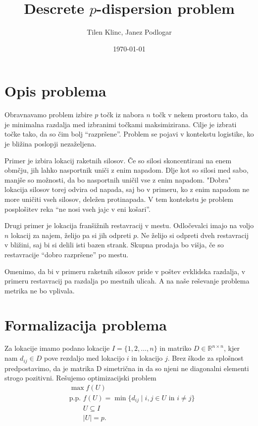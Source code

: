 \documentclass{article}
\title{Descrete $p$-dispersion problem}
\author{Tilen Klinc, Janez Podlogar}
\date{\today}
\begin{document}
    
\maketitle

\section{Opis problema}

Obravnavamo problem izbire $ p $ točk iz nabora $ n $ točk v nekem prostoru
tako, da je minimalna razdalja med izbranimi točkami maksimizirana. Cilje je
izbrati točke tako, da so čim bolj ``razpršene''. Problem se pojavi v kontekstu
logistike, ko je bližina poslopji nezaželjena.


Primer je izbira lokacij raketnih silosov. Če so silosi skoncentirani na enem
obmčju, jih lahko nasportnik uniči z enim napadom. Dlje kot so silosi med sabo,
manjše so možnosti, da bo nasportnih uničil vse z enim napadom. "Dobra" lokacija
silosov torej odvira od napada, saj bo v primeru, ko z enim napadom ne more uničiti
vseh silosov, deležen protinapada. V tem kontekstu je problem posplošitev reka 
``ne nosi vseh jajc v eni košari''.

Drugi primer je lokacija franšižnih restavracij v mestu. Odločevalci imajo na voljo $ n $
lokacij za najem, želijo pa si jih odpreti $ p $. Ne želijo si odpreti dveh restavracij
v bližini, saj bi si delili isti bazen strank. Skupna prodaja bo višja, če so restavracije
``dobro razpršene'' po mestu.

Omenimo, da bi v primeru raketnih silosov pride v poštev evklidska razdalja, v primeru
restavracij pa razdalja po mestnih ulicah. A na naše reševanje problema metrika ne bo 
vplivala.

\section{Formalizacija problema}

Za lokacije imamo podano lokacije $ I = \{ 1, 2, \ldots, n \} $ in matriko $ D \in 
\mathbb{R}^{n \times n} $, kjer nam $ d_{ij} \in D $ pove rezdaljo med lokacijo $ i $
in lokacijo $ j $. Brez škode za splošnost predpostavimo, da je matrika D simetrična in
da so njeni ne diagonalni elementi strogo pozitivni. Rešujemo optimizacijski problem
\begin{align*}
    & \max f(U) \\
    & \text{p.p. } f(U) = \min \{ d_{ij} \mid i,j \in U \text{ in } i \neq j \} \\
    & \qquad U \subseteq I \\
    & \qquad |U| = p .
\end{align*}
\end{document}
